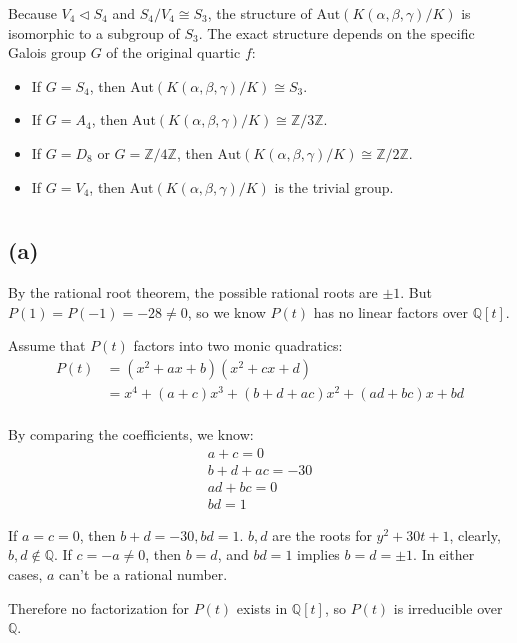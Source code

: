 \documentclass[12pt]{article}
\theoremstyle{definition}
\theoremstyle{remark}
\begin{document}
Because $V_4 \triangleleft S_4$ and $S_4/V_4 \cong S_3$, the structure of $\mathrm{Aut}(K(\alpha, \beta, \gamma)/K)$ is isomorphic to a subgroup of $S_3$. The exact structure depends on the specific Galois group $G$ of the original quartic $f$:
\begin{itemize}
    \item If $G = S_4$, then $\mathrm{Aut}(K(\alpha, \beta, \gamma)/K) \cong S_3$.
    \item If $G = A_4$, then $\mathrm{Aut}(K(\alpha, \beta, \gamma)/K) \cong \mathbb{Z}/3\mathbb{Z}$.
    \item If $G = D_8$ or $G = \mathbb{Z}/4\mathbb{Z}$, then $\mathrm{Aut}(K(\alpha, \beta, \gamma)/K) \cong \mathbb{Z}/2\mathbb{Z}$.
    \item If $G = V_4$, then $\mathrm{Aut}(K(\alpha, \beta, \gamma)/K)$ is the trivial group.
\end{itemize}

\section{} %
\subsection*{(a)}
By the rational root theorem, the possible rational roots are $\pm 1$. But $P(1)=P(-1)=-28\ne 0$, so we know $P(t)$ has no linear factors over $\mathbb{Q}[t]$.

Assume that $P(t)$ factors into two monic quadratics:
\begin{align*}
    P(t)&=(x^2+ax+b)(x^2+cx+d) \\
    &=x^4+(a+c)x^3+(b+d+ac)x^2+(ad+bc)x+bd \\
\end{align*}

By comparing the coefficients, we know:
\begin{align*}
    a+c=0 \\
    b+d+ac=-30 \\
    ad+bc=0 \\
    bd=1
\end{align*}

If $a=c=0$, then $b+d=-30,bd=1$. $b,d$ are the roots for $y^2+30t+1$, clearly, $b,d\notin \mathbb{Q}$. If $c=-a\ne 0$, then $b=d$, and $bd=1$ implies $b=d=\pm 1$. In either cases, $a$ can't be a rational number. 

Therefore no factorization for $P(t)$ exists in $\mathbb{Q}[t]$, so $P(t)$ is irreducible over $\mathbb{Q}$.
\end{document}

